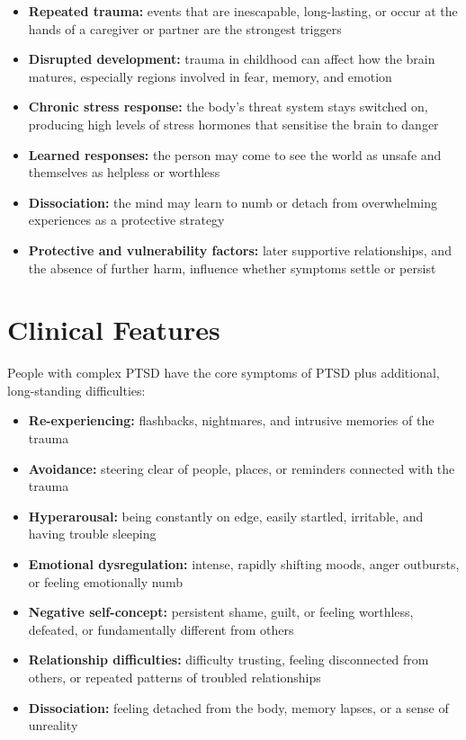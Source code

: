 \begin{itemize}
    \item \textbf{Repeated trauma:} events that are inescapable, long-lasting, or occur at the hands of a caregiver or partner are the strongest triggers
    \item \textbf{Disrupted development:} trauma in childhood can affect how the brain matures, especially regions involved in fear, memory, and emotion
    \item \textbf{Chronic stress response:} the body's threat system stays switched on, producing high levels of stress hormones that sensitise the brain to danger
    \item \textbf{Learned responses:} the person may come to see the world as unsafe and themselves as helpless or worthless
    \item \textbf{Dissociation:} the mind may learn to numb or detach from overwhelming experiences as a protective strategy
    \item \textbf{Protective and vulnerability factors:} later supportive relationships, and the absence of further harm, influence whether symptoms settle or persist
\end{itemize}

\section*{Clinical Features}
People with complex PTSD have the core symptoms of PTSD plus additional, long-standing difficulties:

\begin{itemize}
    \item \textbf{Re-experiencing:} flashbacks, nightmares, and intrusive memories of the trauma
    \item \textbf{Avoidance:} steering clear of people, places, or reminders connected with the trauma
    \item \textbf{Hyperarousal:} being constantly on edge, easily startled, irritable, and having trouble sleeping
    \item \textbf{Emotional dysregulation:} intense, rapidly shifting moods, anger outbursts, or feeling emotionally numb
    \item \textbf{Negative self-concept:} persistent shame, guilt, or feeling worthless, defeated, or fundamentally different from others
    \item \textbf{Relationship difficulties:} difficulty trusting, feeling disconnected from others, or repeated patterns of troubled relationships
    \item \textbf{Dissociation:} feeling detached from the body, memory lapses, or a sense of unreality
\end{itemize}

